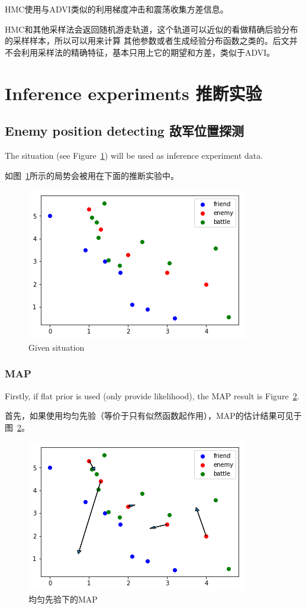 \documentclass{article}
\begin{document}
HMC使用与ADVI类似的利用梯度冲击和震荡收集方差信息。

HMC和其他采样法会返回随机游走轨道，这个轨道可以近似的看做精确后验分布的采样样本，所以可以用来计算
其他参数或者生成经验分布函数之类的。后文并不会利用采样法的精确特征，基本只用上它的期望和方差，类似于ADVI。

\section{Inference experiments 推断实验}

\subsection{Enemy position detecting 敌军位置探测}

The situation (see Figure~\ref{fig:expState}) will be used as inference experiment data.

如图~\ref{fig:expState}所示的局势会被用在下面的推断实验中。

\begin{figure}[ht]
\includegraphics[width=0.6\linewidth]{exp_state.png}
\caption{Given situation}
\label{fig:expState}
\end{figure}


\subsubsection{MAP}

Firstly, if flat prior is used (only provide likelihood), the MAP result is Figure~\ref{fig:MAPone}.

首先，如果使用均匀先验（等价于只有似然函数起作用），MAP的估计结果可见于图~\ref{fig:MAPone}。

\begin{figure}[ht]
\includegraphics[width=0.6\linewidth]{MAP1.png}
\caption{均匀先验下的MAP}
\label{fig:MAPone}
\end{figure}
\end{document}
